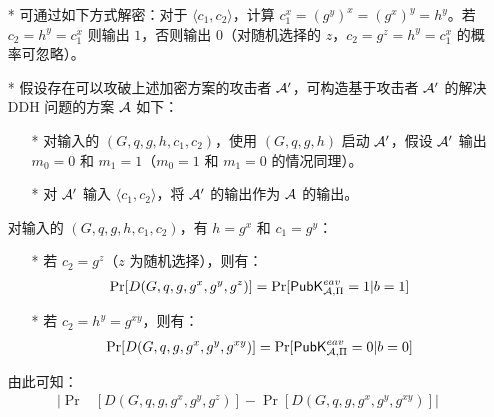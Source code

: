 \begin{questions}
        \begin{solution}
            \begin{enumerate}
                \item[*] 可通过如下方式解密：对于 $\langle{c_1,c_2}\rangle$，计算 $c_1^x=(g^y)^x=(g^x)^y=h^y$。若 $c_2=h^y=c_1^x$ 则输出 $1$，否则输出 $0$（对随机选择的 $z$，$c_2=g^z=h^y=c_1^x$ 的概率可忽略）。
                \item[*] 假设存在可以攻破上述加密方案的攻击者 $\mathcal{A}'$，可构造基于攻击者 $\mathcal{A}'$ 的解决 DDH 问题的方案 $\mathcal{A}$ 如下：
                    \begin{enumerate}
                        \item[*] 对输入的 $(G,q,g,h,c_1,c_2)$，使用 $(G,q,g,h)$ 启动 $\mathcal{A}'$，假设 $\mathcal{A}'$ 输出 $m_0=0$ 和 $m_1=1$（$m_0=1$ 和 $m_1=0$ 的情况同理）。
                        \item[*] 对 $\mathcal{A}'$ 输入 $\langle{c_1,c_2}\rangle$，将 $\mathcal{A}'$ 的输出作为 $\mathcal{A}$ 的输出。
                    \end{enumerate}
                对输入的 $(G,q,g,h,c_1,c_2)$，有 $h=g^x$ 和 $c_1=g^y$：
                    \begin{enumerate}
                        \item[*] 若 $c_2=g^z$（$z$ 为随机选择），则有：
                            \begin{equation}
                                \begin{aligned}
                                    \Pr[D(G,q,g,g^x,g^y,g^z)]=\Pr[\mathsf{PubK}^{eav}_{\mathcal{A},\Pi}=1|b=1]
                                \end{aligned}
                            \end{equation}
                        \item[*] 若 $c_2=h^y=g^{xy}$，则有：
                            \begin{equation}
                                \begin{aligned}
                                    \Pr[D(G,q,g,g^x,g^y,g^{xy})]=\Pr[\mathsf{PubK}^{eav}_{\mathcal{A},\Pi}=0|b=0]
                                \end{aligned}
                            \end{equation}
                    \end{enumerate}
                由此可知：
                    \begin{equation}
                        \begin{aligned}
                            |\Pr&[D(G,q,g,g^x,g^y,g^z)]-\Pr[D(G,q,g,g^x,g^y,g^{xy})]|\\

\end{aligned}
\end{equation}
\end{enumerate}
\end{solution}
\end{questions}
